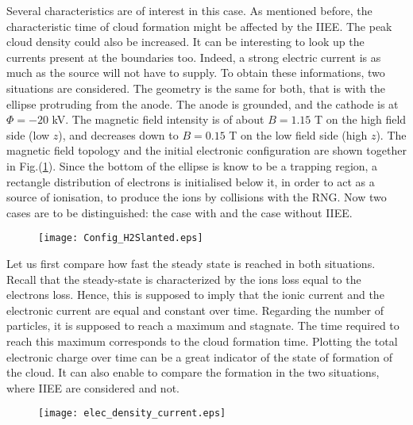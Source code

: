 Several characteristics are of interest in this case. As mentioned before, the characteristic time of cloud formation might be affected by the IIEE. The peak cloud density could also be increased. It can be interesting to look up the currents present at the boundaries too. Indeed, a strong electric current is as much as the source will not have to supply. To obtain these informations, two situations are considered. The geometry is the same for both, that is with the ellipse protruding from the anode. The anode is grounded, and the cathode is at $\Phi = -20$ kV. The magnetic field intensity is of about $B = 1.15$ T on the high field side (low $z$), and decreases down to $B=0.15$ T on the low field side (high $z$). The magnetic field topology and the initial electronic configuration are shown together in Fig.(\ref{Config_mag_Slanted}). Since the bottom of the ellipse is know to be a trapping region, a rectangle distribution of electrons is initialised below it, in order to act as a source of ionisation, to produce the ions by collisions with the RNG. Now two cases are to be distinguished: the case with and the case without IIEE.\\

\begin{figure}[h!]
\centering
	\texttt{[image: Config\_H2Slanted.eps]}
	\caption{\label{Config_mag_Slanted} }
\end{figure}  


Let us first compare how fast the steady state is reached in both situations. Recall that the steady-state is characterized by the ions loss equal to the electrons loss. Hence, this is supposed to imply that the ionic current and the electronic current are equal and constant over time. Regarding the number of particles, it is supposed to reach a maximum and stagnate. The time required to reach this maximum corresponds to the cloud formation time. Plotting the total electronic charge over time can be a great indicator of the state of formation of the cloud. It can also enable to compare the formation in the two situations, where IIEE are considered and not. \\

\begin{figure}[h!]
\centering
	\texttt{[image: elec\_density\_current.eps]}
	\caption{\label{elec_density_current} }
\end{figure}  

